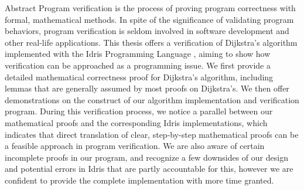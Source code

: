 \begin{poliabstract}{Abstract} 
Program verification is the process of proving program correctness with formal, mathematical methods. In spite of the significance of validating program behaviors, program verification is seldom involved in software development and other real-life applications. This thesis offers a verification of Dijkstra's algorithm \cite{Dijkstras} implemented with the Idris Programming Language \cite{idris}, aiming to show how verification can be approached as a programming issue. We first provide a detailed mathematical correctness proof for Dijkstra's algorithm, including lemmas that are generally assumed by most proofs on Dijkstra's. We then offer demonstrations on the construct of our algorithm implementation and verification program. During this verification process, we notice a parallel between our mathematical proofs and the corresponding Idris implementations, which indicates that direct translation of clear, step-by-step mathematical proofs can be a feasible approach in program verification. We are also aware of certain incomplete proofs in our program, and recognize a few downsides of our design and potential errors in Idris that are partly accountable for this, however we are confident to provide the complete implementation with more time granted. 


\end{poliabstract}